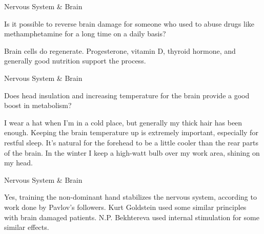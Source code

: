 \documentclass[11pt,oneside,openany,extrafontsizes]{memoir}
\begin{document}
\begin{qaexchange}{Nervous System \& Brain}

    \begin{question}
        Is it possible to reverse brain damage for someone who used to abuse drugs like methamphetamine for a long time on a daily basis?
    \end{question}

    \begin{answer}
      Brain cells do regenerate. Progesterone, vitamin D, thyroid hormone, and generally good nutrition support the process.
    \end{answer}
\end{qaexchange}

\begin{qaexchange}{Nervous System \& Brain}

    \begin{question}
        Does head insulation and increasing temperature for the brain provide a good boost in metabolism?
    \end{question}

    \begin{answer}
        I wear a hat when I'm in a cold place, but generally my thick hair has been enough. Keeping the brain temperature up is extremely important, especially for restful sleep. It's natural for the forehead to be a little cooler than the rear parts of the brain. In the winter I keep a high-watt bulb over my work area, shining on my head.
    \end{answer}
\end{qaexchange}

\begin{standalonequote}{Nervous System \& Brain}

    \begin{answer}
      Yes, training the non-dominant hand stabilizes the nervous system, according to work done by Pavlov's followers. Kurt Goldstein used some similar principles with brain damaged patients. N.P. Bekhtereva used internal stimulation for some similar effects.
    \end{answer}
\end{standalonequote}
\end{document}
